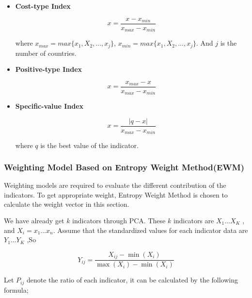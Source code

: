 \documentclass{mcmthesis}
\begin{document}
				\begin{itemize}
					
					\item \textbf{Cost-type Index}
					
					\begin{equation}
					x = \frac{x -  x_{min}}{x_{max} -  x_{min}}
					\end{equation}
					
					where $x_{max} = max\{x_1, X_2, ... ,x_j\}$, $x_{min} = max\{x_1, X_2, ... ,x_j\}$. And $j$ is the number of countries.
					
					\item \textbf{Positive-type Index}
					
					\begin{equation}
					x = \frac{x_{max} - x}{x_{max} -  x_{min}}
					\end{equation}
					
					\item \textbf{Specific-value Index}
					
					\begin{equation}
					x = \frac{\vert q - x\vert}{x_{max} -  x_{min}}
					\end{equation}
					
					where $q$ is the best value of the indicator.
					
				\end{itemize}
			
			\subsubsection{Weighting Model Based on Entropy Weight Method(EWM)}
			
			Weighting models are required to evaluate the different contribution of the indicators. To get appropriate weight, Entropy Weight Method is chosen to calculate the weight vector in this section.
			
			We have already get $k$ indicators through PCA. These $k$ indicators are $X_1 \ldots X_K$ , and $X_i={x_1 \ldots x_n}$. Assume that the standardized values for each indicator data are $Y_1 \ldots Y_K$ ,So
			
			\begin{equation}
			Y _ { i j } = \frac { X _ { i j } - \min \left( X _ { i } \right) } { \max \left( X _ { i } \right) - \min \left( X _ { i } \right) }
			\end{equation}
			
			Let $P_{ij}$ denote the ratio of each indicator, it can be calculated by the following formula;
			
\end{document}
